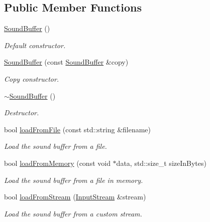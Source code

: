 \subsection*{Public Member Functions}
\begin{DoxyCompactItemize}
\item 
\mbox{\hyperlink{classsf_1_1_sound_buffer_a0cabfbfe19b831bf7d5c9592d92ef233}{Sound\+Buffer}} ()
\begin{DoxyCompactList}\small\item\em Default constructor. \end{DoxyCompactList}\item 
\mbox{\hyperlink{classsf_1_1_sound_buffer_aaf000fc741ff27015907e8588263f4a6}{Sound\+Buffer}} (const \mbox{\hyperlink{classsf_1_1_sound_buffer}{Sound\+Buffer}} \&copy)
\begin{DoxyCompactList}\small\item\em Copy constructor. \end{DoxyCompactList}\item 
\mbox{\hyperlink{classsf_1_1_sound_buffer_aea240161724ffba74a0d6a9e277d3cd5}{$\sim$\+Sound\+Buffer}} ()
\begin{DoxyCompactList}\small\item\em Destructor. \end{DoxyCompactList}\item 
bool \mbox{\hyperlink{classsf_1_1_sound_buffer_a2be6a8025c97eb622a7dff6cf2594394}{load\+From\+File}} (const std\+::string \&filename)
\begin{DoxyCompactList}\small\item\em Load the sound buffer from a file. \end{DoxyCompactList}\item 
bool \mbox{\hyperlink{classsf_1_1_sound_buffer_af8cfa5599739a7edae69c5cba273d33f}{load\+From\+Memory}} (const void $\ast$data, std\+::size\+\_\+t size\+In\+Bytes)
\begin{DoxyCompactList}\small\item\em Load the sound buffer from a file in memory. \end{DoxyCompactList}\item 
bool \mbox{\hyperlink{classsf_1_1_sound_buffer_ad292156b1e01f6dabd4c0c277d5e079e}{load\+From\+Stream}} (\mbox{\hyperlink{classsf_1_1_input_stream}{Input\+Stream}} \&stream)
\begin{DoxyCompactList}\small\item\em Load the sound buffer from a custom stream. \end{DoxyCompactList}\item 

\end{DoxyCompactItemize}
